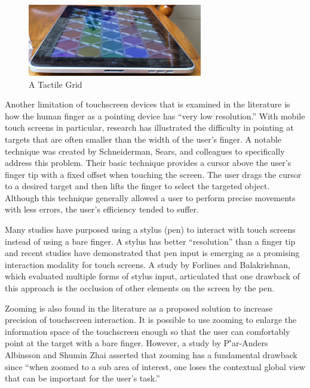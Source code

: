 \documentclass[11pt]{article}
\begin{document}
\begin{figure}[ht]
\centering
\includegraphics[width=3in]{TactileGrid.jpg} 
\caption{A Tactile Grid}
\label{tactile-grid}
\end{figure}

Another limitation of touchscreen devices that is examined in the literature is how the human finger as a pointing device has ``very low resolution.''\cite{Albinsson} With mobile touch screens in particular, research has illustrated the difficulty in pointing at targets that are often smaller than the width of the user's finger. A notable technique was created by Schneiderman, Sears, and colleagues to specifically address this problem.\cite{Sears} Their basic technique provides a cursor above the user's finger tip with a fixed offset when touching the screen. The user drags the cursor to a desired target and then lifts the finger to select the targeted object. Although this technique generally allowed a user to perform precise movements with less errors, the user's efficiency tended to suffer.\cite{Sears}

Many studies have purposed using a stylus (pen) to interact with touch screens instead of using a bare finger. A stylus has better ``resolution'' than a finger tip and recent studies have demonstrated that pen input is emerging as a promising interaction modality for touch screens.\cite{Bi} A study by Forlines and Balakrishnan, which evaluated multiple forms of stylus input, articulated that one drawback of this approach is the occlusion of other elements on the screen by the pen.\cite{Forlines}

Zooming is also found in the literature as a proposed solution to increase precision of touchscreen interaction. It is possible to use zooming to enlarge the information space of the touchscreen enough so that the user can comfortably point at the target with a bare finger. However, a study by P\''{a}r-Anders Albinsson and Shumin Zhai asserted that zooming has a fundamental drawback since ``when zoomed to a sub area of interest, one loses the contextual global view that can be important for the user's task.''\cite{Albinsson} 
\end{document}
